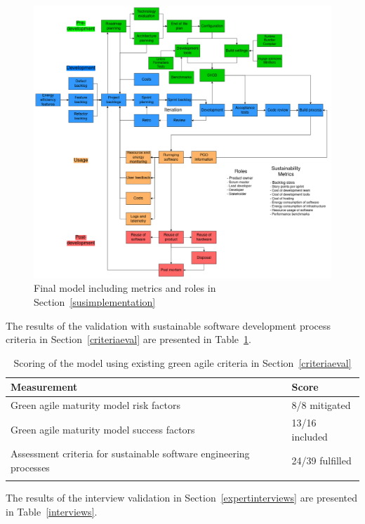\begin{figure}[H]
\caption{Final model including metrics and roles in Section~\ref{susimplementation}}
\label{final}
\includegraphics[width=\textwidth]{images/result_model.png}
\centering
\end{figure}

The results of the validation with sustainable software development process criteria in Section~\ref{criteriaeval} are presented in Table~\ref{scores}.

\begin{longtable}{ |p{}|p{}| }
\hline
\textbf{Measurement} & \textbf{Score}\\
\hline
Green agile maturity model risk factors & 8/8 mitigated\\
\hline
Green agile maturity model success factors & 13/16 included\\
\hline
Assessment criteria for sustainable software engineering processes & 24/39 fulfilled\\
\hline
\caption{Scoring of the model using existing green agile criteria in Section~\ref{criteriaeval}}
\label{scores}
\end{longtable}

The results of the interview validation in Section~\ref{expertinterviews} are presented in Table~\ref{interviews}.


